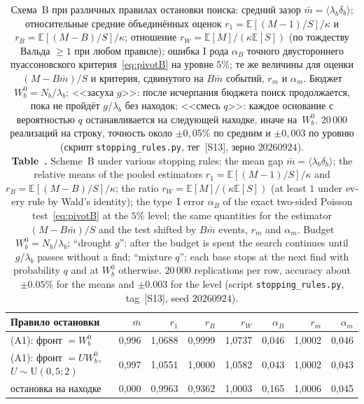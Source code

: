 \documentclass[11pt,a4paper]{article}
\newcommand{\encaptab}[1]{\\[3pt]\foreignlanguage{english}{%
  \textbf{Table~\thetable.} #1}}
\theoremstyle{plain}
\theoremstyle{remark}
\begin{document}
\begin{table}[t]
\centering
\caption{Схема~B при различных правилах остановки поиска: средний зазор
$\bar m=\langle\lambda_b\delta_b\rangle$; относительные средние объединённых оценок
$r_1=\mathbb E[(M-1)/S]/\kappa$ и $r_B=\mathbb E[(M-B)/S]/\kappa$; отношение
$r_W=\mathbb E[M]/(\kappa\mathbb E[S])$ (по тождеству Вальда $\ge1$ при любом
правиле); ошибка I рода $\alpha_B$ точного двустороннего пуассоновского
критерия~\eqref{eq:pivotB} на уровне $5\%$; те же величины для оценки
$(M-B\bar m)/S$ и критерия, сдвинутого на $B\bar m$ событий, $r_m$ и $\alpha_m$. Бюджет
$W^0_b=N_b/\lambda_b$; <<засуха $g$>>: после исчерпания бюджета поиск продолжается,
пока не пройдёт $g/\lambda_b$ без находок; <<смесь $q$>>: каждое основание с
вероятностью $q$ останавливается на следующей находке, иначе на~$W^0_b$.
$20\,000$ реализаций на строку, точность около $\pm0{,}05\%$ по средним и
$\pm0{,}003$ по уровню (скрипт \texttt{stopping\_rules.py}, тег~[S13], зерно
$20260924$).
\encaptab{Scheme~B under various stopping rules: the mean gap
$\bar m=\langle\lambda_b\delta_b\rangle$; the relative means of the pooled
estimators $r_1=\mathbb E[(M-1)/S]/\kappa$ and $r_B=\mathbb E[(M-B)/S]/\kappa$; the
ratio $r_W=\mathbb E[M]/(\kappa\mathbb E[S])$ (at least $1$ under every rule by Wald's
identity); the type~I error $\alpha_B$ of the exact two-sided Poisson
test~\eqref{eq:pivotB} at the $5\%$ level; the same quantities for the estimator
$(M-B\bar m)/S$ and the test shifted by $B\bar m$ events, $r_m$ and $\alpha_m$. Budget
$W^0_b=N_b/\lambda_b$; ``drought $g$'': after the budget is spent the search
continues until $g/\lambda_b$ passes without a find; ``mixture $q$'': each base stops
at the next find with probability $q$ and at $W^0_b$ otherwise. $20\,000$
replications per row, accuracy about $\pm0.05\%$ for the means and $\pm0.003$ for
the level (script \texttt{stopping\_rules.py}, tag~[S13], seed $20260924$).}}
\label{tab:stop}
\small
\setlength{\tabcolsep}{4pt}
\begin{tabular}{lrrrrrrr}
\toprule
Правило остановки & $\bar m$ & $r_1$ & $r_B$ & $r_W$ & $\alpha_B$ & $r_m$ & $\alpha_m$\\
\midrule
(A1): фронт $=W^0_b$ & 0{,}996 & 1{,}0688 & 0{,}9999 & 1{,}0737 & 0{,}046 & 1{,}0002 & 0{,}046\\
(A1): фронт $=UW^0_b$, $U\sim\mathrm U(0{,}5;2)$ & 0{,}997 & 1{,}0551 & 1{,}0000 & 1{,}0582 & 0{,}043 & 1{,}0002 & 0{,}043\\
остановка на находке & 0{,}000 & 0{,}9963 & 0{,}9362 & 1{,}0003 & 0{,}165 & 1{,}0006 & 0{,}045\\

\end{tabular}
\end{table}
\end{document}
